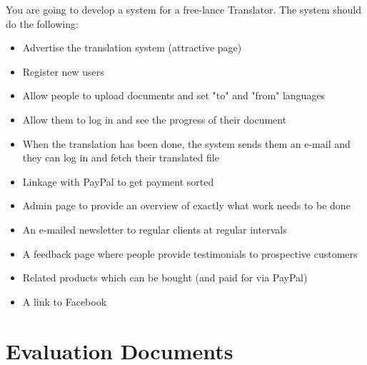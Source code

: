 \documentclass{l3proj}
\begin{document}
You are going to develop a system for a free-lance Translator. The system should do the following:

\begin{itemize}
\item{Advertise the translation system (attractive page)}
\item{Register new users}
\item{Allow people to upload documents and set "to" and "from" languages}
\item{Allow them to log in and see the progress of their document}
\item{When the translation has been done, the system sends them an e-mail and they can log in and fetch their translated file}
\item{Linkage with PayPal to get payment sorted}
\item{Admin page to provide an overview of exactly what work needs to be done}
\item{An e-mailed newsletter to regular clients at regular intervals}
\item{A feedback page where people provide testimonials to prospective customers}
\item{Related products which can be bought (and paid for via PayPal)}
\item{A link to Facebook}
\end{itemize}


\chapter{Evaluation Documents}
\label{chap:eval-docs}
\end{document}
